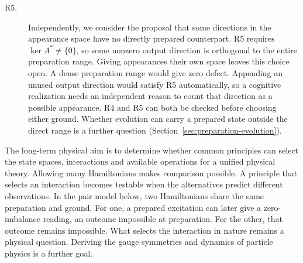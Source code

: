 \documentclass[11pt]{article}
\theoremstyle{definition}
\begin{document}
\begin{description}
\item[R5.] Independently, we consider the proposal that some directions in the appearance space have no directly prepared counterpart. R5 requires $\ker A^*\ne\{0\}$, so some nonzero output direction is orthogonal to the entire preparation range. Giving appearances their own space leaves this choice open. A dense preparation range would give zero defect. Appending an unused output direction would satisfy R5 automatically, so a cognitive realization needs an independent reason to count that direction as a possible appearance. R4 and R5 can both be checked before choosing either ground. Whether evolution can carry a prepared state outside the direct range is a further question (Section~\ref{sec:preparation-evolution}).
\end{description}

The long-term physical aim is to determine whether common principles can select the state spaces, interactions and available operations for a unified physical theory. Allowing many Hamiltonians makes comparison possible. A principle that selects an interaction becomes testable when the alternatives predict different observations. In the pair model below, two Hamiltonians share the same preparation and ground. For one, a prepared excitation can later give a zero-imbalance reading, an outcome impossible at preparation. For the other, that outcome remains impossible. What selects the interaction in nature remains a physical question. Deriving the gauge symmetries and dynamics of particle physics is a further goal.
\end{document}
